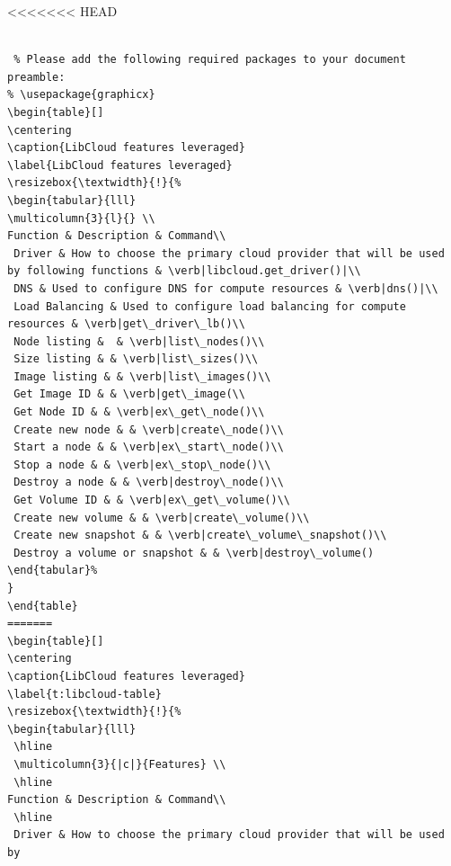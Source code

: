 <<<<<<< HEAD
\begin{verbatim}
 
 % Please add the following required packages to your document preamble:
% \usepackage{graphicx}
\begin{table}[]
\centering
\caption{LibCloud features leveraged}
\label{LibCloud features leveraged}
\resizebox{\textwidth}{!}{%
\begin{tabular}{lll}
\multicolumn{3}{l}{} \\
Function & Description & Command\\
 Driver	& How to choose the primary cloud provider that will be used by following functions	& \verb|libcloud.get_driver()|\\
 DNS & Used to configure DNS for compute resources & \verb|dns()|\\
 Load Balancing & Used to configure load balancing for compute resources & \verb|get\_driver\_lb()\\
 Node listing &  & \verb|list\_nodes()\\
 Size listing & & \verb|list\_sizes()\\
 Image listing & & \verb|list\_images()\\
 Get Image ID & & \verb|get\_image(\\
 Get Node ID & & \verb|ex\_get\_node()\\
 Create new node & & \verb|create\_node()\\
 Start a node & & \verb|ex\_start\_node()\\
 Stop a node & & \verb|ex\_stop\_node()\\
 Destroy a node & & \verb|destroy\_node()\\
 Get Volume ID & & \verb|ex\_get\_volume()\\
 Create new volume & & \verb|create\_volume()\\
 Create new snapshot & & \verb|create\_volume\_snapshot()\\
 Destroy a volume or snapshot & & \verb|destroy\_volume()  
\end{tabular}%
}
\end{table}
=======
\begin{table}[]
\centering
\caption{LibCloud features leveraged}
\label{t:libcloud-table}
\resizebox{\textwidth}{!}{%
\begin{tabular}{lll}
 \hline
 \multicolumn{3}{|c|}{Features} \\
 \hline
Function & Description & Command\\
 \hline
 Driver	& How to choose the primary cloud provider that will be used by

\end{verbatim}
